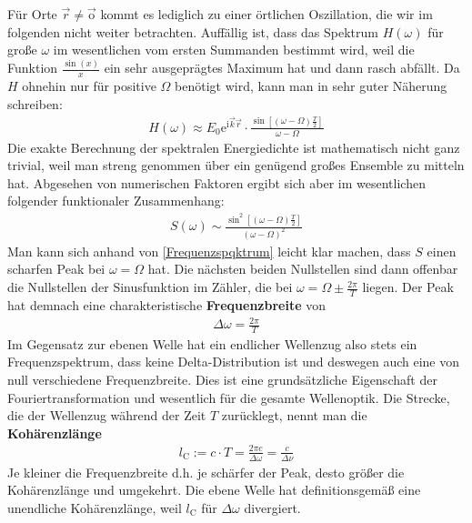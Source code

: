 \documentclass[german,  %
parskip=full,  %
]{scrartcl}
\begin{document}
Für Orte \(\vec{r}\neq \vec{\mathrm{o}}\) kommt es lediglich zu einer örtlichen Oszillation, die wir im folgenden nicht weiter betrachten. Auffällig ist, dass das Spektrum \(H(\omega)\) für große \(\omega\) im wesentlichen vom ersten Summanden bestimmt wird, weil die Funktion \(\frac{\sin(x)}{x}\) ein sehr ausgeprägtes Maximum hat und dann rasch abfällt. Da \(H\) ohnehin nur für positive \(\Omega\) benötigt wird, kann man in sehr guter Näherung schreiben:
\begin{align}
H(\omega) \approx E_0 \mathrm{e}^{\mathrm{i}\vec{k}\vec{r}}\cdot \frac{\sin\left[(\omega - \Omega)\frac{T}{2}\right]}{\omega - \Omega}  
\end{align}
Die exakte Berechnung der spektralen Energiedichte ist mathematisch nicht ganz trivial, weil man streng genommen über ein genügend großes Ensemble zu mitteln hat. Abgesehen von numerischen Faktoren ergibt sich aber im wesentlichen folgender funktionaler Zusammenhang:
\begin{align}
S(\omega) \sim \frac{\sin^2\left[(\omega - \Omega)\frac{T}{2}\right]}{(\omega - \Omega)^2}  
\end{align}
Man kann sich anhand von \ref{Frequenzspqktrum} leicht klar machen, dass \(S\) einen scharfen Peak bei \(\omega=\Omega\) hat. Die nächsten beiden Nullstellen sind dann offenbar die Nullstellen der Sinusfunktion im Zähler, die bei \(\omega = \Omega \pm \frac{2\pi}{T}\) liegen. Der Peak hat demnach eine charakteristische \textbf{Frequenzbreite} von
\begin{align}
\Delta \omega = \frac{2\pi}{T}  
\end{align}
Im Gegensatz zur ebenen Welle hat ein endlicher Wellenzug also stets ein Frequenzspektrum, dass keine Delta-Distribution ist und deswegen auch eine von null verschiedene Frequenzbreite. Dies ist eine grundsätzliche Eigenschaft der Fouriertransformation und wesentlich für die gesamte Wellenoptik. Die Strecke, die der Wellenzug während der Zeit \(T\) zurücklegt, nennt man die \textbf{Kohärenzlänge}
\begin{align}
l_{\mathrm{C}} := c\cdot T = \frac{2\pi c}{\Delta\omega} = \frac{c}{\Delta\nu} 
\end{align}
Je kleiner die Frequenzbreite d.h. je schärfer der Peak, desto größer die Kohärenzlänge und umgekehrt. Die ebene Welle hat definitionsgemäß eine unendliche Kohärenzlänge, weil \(l_{\mathrm{C}}\) für \(\Delta\omega\) divergiert. 
\end{document}
